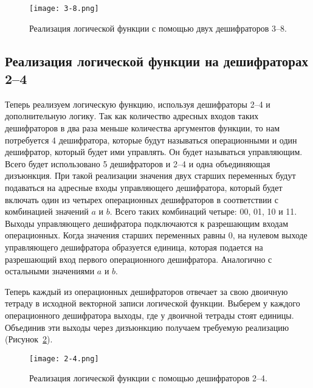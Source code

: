 \documentclass[a4paper]{article}
\begin{document}
    \begin{figure}[h]
        \centering
        \texttt{[image: 3-8.png]}

        \caption{\centering Реализация логической функции с помощью двух дешифраторов 3--8.}
        \label{fig:decoder-3-8}
    \end{figure}

    \subsection{Реализация логической функции на дешифраторах 2--4}\label{subsec:decoder-2-4}

    Теперь реализуем логическую функцию, используя дешифраторы 2--4 и дополнительную логику.
    Так как количество адресных входов таких дешифраторов в два раза меньше количества аргументов функции,
    то нам потребуется 4 дешифратора, которые будут называться операционными и один дешифратор,
    который будет ими управлять.
    Он будет называться управляющим.
    Всего будет использовано 5 дешифраторов и 2--4 и одна объединяющая дизъюнкция.
    При такой реализации значения двух старших переменных будут подаваться
    на адресные входы управляющего дешифратора,
    который будет включать один из четырех операционных дешифраторов
    в соответствии с комбинацией значений $ a $ и $ b $.
    Всего таких комбинаций четыре: 00, 01, 10 и 11.
    Выходы управляющего дешифратора подключаются к разрешающим входам операционных.
    Когда значения старших переменных равны 0, на нулевом выходе управляющего дешифратора
    образуется единица, которая подается на разрешающий вход первого операционного дешифратора.
    Аналогично с остальными значениями $ a $ и $ b $.

    Теперь каждый из операционных дешифраторов отвечает за свою двоичную тетраду
    в исходной векторной записи логической функции.
    Выберем у каждого операционного дешифратора выходы, где у двоичной тетрады стоят единицы.
    Объединив эти выходы через дизъюнкцию получаем требуемую реализацию (Рисунок~\ref{fig:decoder-2-4}).

    \begin{figure}[h]
        \centering
        \texttt{[image: 2-4.png]}

        \caption{\centering Реализация логической функции с помощью дешифраторов 2--4.}
        \label{fig:decoder-2-4}
    \end{figure}
\end{document}
